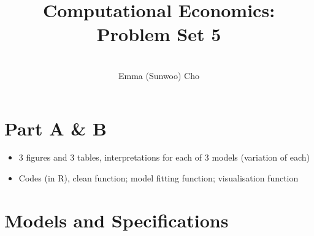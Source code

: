 \documentclass[11pt]{article}
\title{ %
  \textbf{Computational Economics: Problem Set 5}}
\author{\\Emma (Sunwoo) Cho}
\makeatletter
\let\inserttitle\@title
\let\insertauthor\@author
\makeatother
\begin{document}
\begin{center}
  \LARGE{\inserttitle}

  \insertauthor
\end{center}
\section*{Part A \& B}
\begin{itemize}
    \item 3 figures and 3 tables, interpretations for each of 3 models (variation of each)
    \item Codes (in R), clean function; model fitting function; visualisation function
\end{itemize}

\section*{Models and Specifications}
\end{document}
